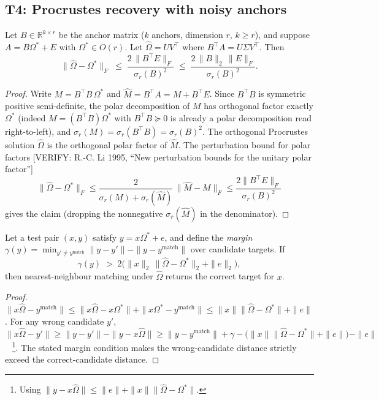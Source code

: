 \subsection{T4: Procrustes recovery with noisy anchors}

\begin{theorem}
\label{thm:T4}
Let $B\in\mathbb{R}^{k\times r}$ be the anchor matrix
($k$ anchors, dimension $r$, $k\ge r$), and suppose
$A=B\Omega^{*}+E$ with $\Omega^{*}\in O(r)$. Let
$\hat\Omega=UV^{\top}$ where $B^{\top}A=U\Sigma V^{\top}$. Then
\[
\|\hat\Omega-\Omega^{*}\|_F
\;\le\;\frac{2\,\|B^{\top}E\|_F}{\sigma_{r}(B)^{2}}
\;\le\;\frac{2\,\|B\|_2\,\|E\|_F}{\sigma_{r}(B)^{2}} .
\]
\end{theorem}

\begin{proof}
Write $M=B^{\top}B\,\Omega^{*}$ and $\hat M=B^{\top}A=M+B^{\top}E$.
Since $B^{\top}B$ is symmetric positive semi-definite, the polar
decomposition of $M$ has orthogonal factor exactly $\Omega^{*}$
(indeed $M=(B^{\top}B)\Omega^{*}$ with $B^{\top}B\succeq0$ is already
a polar decomposition read right-to-left), and
$\sigma_{r}(M)=\sigma_{r}(B^{\top}B)=\sigma_{r}(B)^{2}$. The
orthogonal Procrustes solution $\hat\Omega$ is the orthogonal polar
factor of $\hat M$. The perturbation bound for polar factors
[VERIFY: R.-C. Li 1995, ``New perturbation bounds for the unitary
polar factor'']
\[
\|\hat\Omega-\Omega^{*}\|_F
\le\frac{2}{\sigma_r(M)+\sigma_r(\hat M)}\,\|\hat M-M\|_F
\le\frac{2\|B^{\top}E\|_F}{\sigma_r(B)^2}
\]
gives the claim (dropping the nonnegative $\sigma_r(\hat M)$ in the
denominator).
\end{proof}

\begin{proposition}
\label{prop:margin}
Let a test pair $(x,y)$ satisfy $y=x\Omega^{*}+e$, and define the
\emph{margin}
$\gamma(y)=\min_{y'\neq y^{\mathrm{match}}}\|y-y'\|
-\|y-y^{\mathrm{match}}\|$ over candidate targets. If
\[
\gamma(y)\;>\;2\bigl(\|x\|_2\,\|\hat\Omega-\Omega^{*}\|_2
+\|e\|_2\bigr),
\]
then nearest-neighbour matching under $\hat\Omega$ returns the correct
target for $x$.
\end{proposition}

\begin{proof}
$\|x\hat\Omega-y^{\mathrm{match}}\|
\le\|x\hat\Omega-x\Omega^{*}\|+\|x\Omega^{*}-y^{\mathrm{match}}\|
\le\|x\|\|\hat\Omega-\Omega^{*}\|+\|e\|$. For any wrong candidate
$y'$,
$\|x\hat\Omega-y'\|\ge\|y-y'\|-\|y-x\hat\Omega\|
\ge\|y-y^{\mathrm{match}}\|+\gamma
-\bigl(\|x\|\|\hat\Omega-\Omega^{*}\|+\|e\|\bigr)-\|e\|$~%
\footnote{Using $\|y-x\hat\Omega\|\le\|e\|+\|x\|\|\hat\Omega-\Omega^*\|$.}.
The stated margin condition makes the wrong-candidate distance
strictly exceed the correct-candidate distance.
\end{proof}

